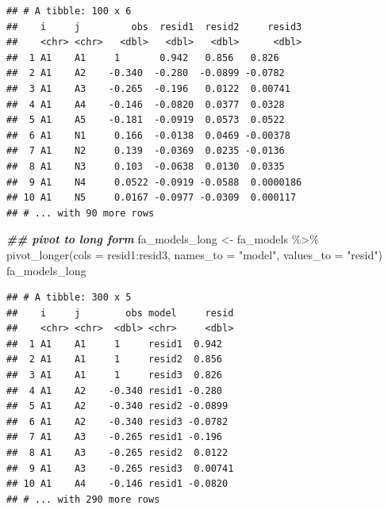 \documentclass[
]{book}
\newenvironment{Shaded}{\begin{snugshade}}{\end{snugshade}}
\newcommand{\AttributeTok}[1]{\textcolor[rgb]{0.77,0.63,0.00}{#1}}
\newcommand{\DocumentationTok}[1]{\textcolor[rgb]{0.56,0.35,0.01}{\textbf{\textit{#1}}}}
\newcommand{\FunctionTok}[1]{\textcolor[rgb]{0.00,0.00,0.00}{#1}}
\newcommand{\NormalTok}[1]{#1}
\newcommand{\OtherTok}[1]{\textcolor[rgb]{0.56,0.35,0.01}{#1}}
\newcommand{\SpecialCharTok}[1]{\textcolor[rgb]{0.00,0.00,0.00}{#1}}
\newcommand{\StringTok}[1]{\textcolor[rgb]{0.31,0.60,0.02}{#1}}
\begin{document}
\begin{Shaded}
\end{Shaded}

\begin{verbatim}
## # A tibble: 100 x 6
##    i     j         obs  resid1  resid2     resid3
##    <chr> <chr>   <dbl>   <dbl>   <dbl>      <dbl>
##  1 A1    A1     1       0.942   0.856   0.826    
##  2 A1    A2    -0.340  -0.280  -0.0899 -0.0782   
##  3 A1    A3    -0.265  -0.196   0.0122  0.00741  
##  4 A1    A4    -0.146  -0.0820  0.0377  0.0328   
##  5 A1    A5    -0.181  -0.0919  0.0573  0.0522   
##  6 A1    N1     0.166  -0.0138  0.0469 -0.00378  
##  7 A1    N2     0.139  -0.0369  0.0235 -0.0136   
##  8 A1    N3     0.103  -0.0638  0.0130  0.0335   
##  9 A1    N4     0.0522 -0.0919 -0.0588  0.0000186
## 10 A1    N5     0.0167 -0.0977 -0.0309  0.000117 
## # ... with 90 more rows
\end{verbatim}

\begin{Shaded}
\begin{Highlighting}[]
\DocumentationTok{\#\# pivot to long form}
\NormalTok{fa\_models\_long }\OtherTok{\textless{}{-}}\NormalTok{ fa\_models }\SpecialCharTok{\%\textgreater{}\%} 
  \FunctionTok{pivot\_longer}\NormalTok{(}\AttributeTok{cols =}\NormalTok{ resid1}\SpecialCharTok{:}\NormalTok{resid3, }\AttributeTok{names\_to =} \StringTok{"model"}\NormalTok{, }\AttributeTok{values\_to =} \StringTok{"resid"}\NormalTok{)}
\NormalTok{fa\_models\_long}
\end{Highlighting}
\end{Shaded}

\begin{verbatim}
## # A tibble: 300 x 5
##    i     j        obs model     resid
##    <chr> <chr>  <dbl> <chr>     <dbl>
##  1 A1    A1     1     resid1  0.942  
##  2 A1    A1     1     resid2  0.856  
##  3 A1    A1     1     resid3  0.826  
##  4 A1    A2    -0.340 resid1 -0.280  
##  5 A1    A2    -0.340 resid2 -0.0899 
##  6 A1    A2    -0.340 resid3 -0.0782 
##  7 A1    A3    -0.265 resid1 -0.196  
##  8 A1    A3    -0.265 resid2  0.0122 
##  9 A1    A3    -0.265 resid3  0.00741
## 10 A1    A4    -0.146 resid1 -0.0820 
## # ... with 290 more rows
\end{verbatim}
\end{document}
